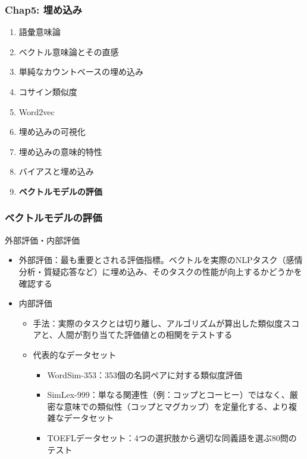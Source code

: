 \documentclass[unicode,11pt]{beamer} %
\begin{document}

\begin{frame}
    \frametitle{Chap5: 埋め込み}
    \begin{block}{}
        \begin{enumerate}
            \item 語彙意味論
            \item ベクトル意味論とその直感
            \item 単純なカウントベースの埋め込み
            \item コサイン類似度
            \item Word2vec
            \item 埋め込みの可視化
            \item 埋め込みの意味的特性
            \item バイアスと埋め込み
            \item {\color{red}\textbf{ベクトルモデルの評価}}
        \end{enumerate}
    \end{block}
\end{frame}

\begin{frame}
    \frametitle{ベクトルモデルの評価}
    \begin{alertblock}{外部評価・内部評価}
        \begin{itemize}
            \item 外部評価：最も重要とされる評価指標。ベクトルを実際のNLPタスク（感情分析・質疑応答など）に埋め込み、そのタスクの性能が向上するかどうかを確認する
            \item 内部評価\\
            \begin{itemize}
                \item 手法：実際のタスクとは切り離し、アルゴリズムが算出した類似度スコアと、人間が割り当てた評価値との相関をテストする
                \item 代表的なデータセット
                \begin{itemize}
                    \item WordSim-353：353個の名詞ペアに対する類似度評価
                    \item SimLex-999：単なる関連性（例：コップとコーヒー）ではなく、厳密な意味での類似性（コップとマグカップ）を定量化する、より複雑なデータセット
                    \item TOEFLデータセット：4つの選択肢から適切な同義語を選ぶ80問のテスト
                \end{itemize}
            \end{itemize}
        \end{itemize}
    \end{alertblock}
\end{frame}
\end{document}
